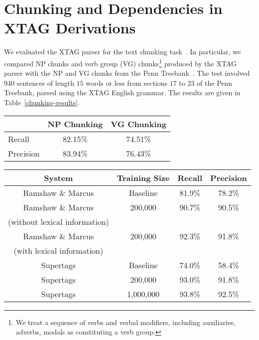 \section{Chunking and Dependencies in XTAG Derivations}

We evaluated the XTAG parser for the text chunking
task~\cite{abney91}. In particular, we compared NP chunks and verb
group (VG) chunks\footnote{We treat a sequence of verbs and verbal
  modifiers, including auxiliaries, adverbs, modals as constituting a
  verb group.}  produced by the XTAG parser with the NP and VG chunks
from the Penn Treebank~\cite{marcus93}. The test involved $940$
sentences of length $15$ words or less from sections $17$ to $23$ of
the Penn Treebank, parsed using the XTAG English grammar. The results
are given in Table~\ref{chunking-results}.

\begin{table*}[htb]
\centering
\begin{tabular}{|l|c|c|}
\hline
& NP Chunking & VG Chunking \\ \hline
Recall & 82.15\% & 74.51\% \\ \hline
Precision & 83.94\%  & 76.43\% \\ \hline
\end{tabular}
\caption{Text Chunking performance of the XTAG parser}
\label{chunking-results}
\end{table*} 

\begin{table*}[htb]
\centering
\begin{tabular}{|c|c|c|c|} \hline
System & Training Size & Recall & Precision  \\ \hline \hline
Ramshaw \& Marcus & Baseline & 81.9\% & 78.2\% \\ \hline
Ramshaw \& Marcus & 200,000 & 90.7\% & 90.5\% \\ 
(without lexical information) & & & \\ \hline 
Ramshaw \& Marcus & 200,000 & 92.3\% & 91.8\% \\ 
(with lexical information) & & & \\ \hline \hline
Supertags & Baseline & 74.0\% & 58.4\% \\ \hline
Supertags & 200,000 & 93.0\% & 91.8\% \\ \hline
Supertags & 1,000,000 & 93.8\% & 92.5\% \\ \hline
\end{tabular}
\caption{Performance comparison of the transformation based noun
chunker and the supertag based noun chunker}
\label{nc-compare}
\end{table*}

